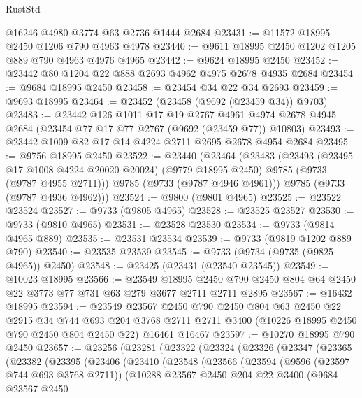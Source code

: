 \begin{lexlean}{RustStd}
\begin{coremodule}
{\begin{coremodule}
{{{{{{{{{{{{{{{{{{{{{{{{{{{{{{{{{{{{{{{{{{{{{{{{{{{{{{{    @16246
    @4980
    @3774
    @63
    @2736
    @1444
    @2684
@23431 := @11572 @18995 @2450 @1206 @790 @4963 @4978
@23440 := @9611 @18995 @2450 @1202 @1205 @889 @790 @4963 @4976 @4965
@23442 := @9624 @18995 @2450
@23452 := @23442 @80 @1204 @22 @888 @2693 @4962 @4975 @2678 @4935 @2684
@23454 := @9684 @18995 @2450
@23458 := @23454 @34 @22 @34 @2693
@23459 := @9693 @18995
@23464 := @23452 (@23458 (@9692 (@23459 @34)) @9703)
@23483 := @23442
    @126
    @1011
    @17
    @19
    @2767
    @4961
    @4974
    @2678
    @4945
    @2684
    (@23454 @77 @17 @77 @2767 (@9692 (@23459 @77)) @10803)
@23493 := @23442 @1009 @82 @17 @14 @4224 @2711 @2695 @2678 @4954 @2684
@23495 := @9756 @18995 @2450
@23522 := @23440
    (@23464
      (@23483
        (@23493
          (@23495 @17 @1008 @4224 @20020 @20024)
          (@9779 @18995 @2450)
          @9785
          (@9733 (@9787 @4955 @2711)))
        @9785
        (@9733 (@9787 @4946 @4961)))
      @9785
      (@9733 (@9787 @4936 @4962)))
@23524 := @9800 (@9801 @4965)
@23525 := @23522 @23524
@23527 := @9733 (@9805 @4965)
@23528 := @23525 @23527
@23530 := @9733 (@9810 @4965)
@23531 := @23528 @23530
@23534 := @9733 (@9814 @4965 @889)
@23535 := @23531 @23534
@23539 := @9733 (@9819 @1202 @889 @790)
@23540 := @23535 @23539
@23545 := @9733 (@9734 (@9735 (@9825 @4965)) @2450)
@23548 := @23425 (@23431 (@23540 @23545))
@23549 := @10023 @18995
@23566 := @23549
    @18995
    @2450
    @790
    @2450
    @804
    @64
    @2450
    @22
    @3773
    @77
    @731
    @63
    @279
    @3677
    @2711
    @2711
    @2895
@23567 := @16432 @18995
@23594 := @23549
    @23567
    @2450
    @790
    @2450
    @804
    @63
    @2450
    @22
    @2915
    @34
    @744
    @693
    @204
    @3768
    @2711
    @2711
    @3400
    (@10226 @18995 @2450 @790 @2450 @804 @2450 @22)
    @16461
    @16467
@23597 := @10270 @18995 @790 @2450
@23657 := @23256
    (@23281
      (@23322
        (@23324
          (@23326
            (@23347
              (@23365
                (@23382
                  (@23395
                    (@23406
                      (@23410
                        (@23548
                          (@23566
                            (@23594
                              (@9596 (@23597 @744 @693 @3768 @2711))
                              (@10288
                                @23567
                                @2450
                                @204
                                @22
                                @3400
                                (@9684
                                  @23567
                                  @2450
}}}}}}}}}}}}}}}}}}}}}}}}}}}}}}}}}}}}}}}}}}}}}}}}}}}}}}}
\end{coremodule}}
\end{coremodule}
\end{lexlean}
